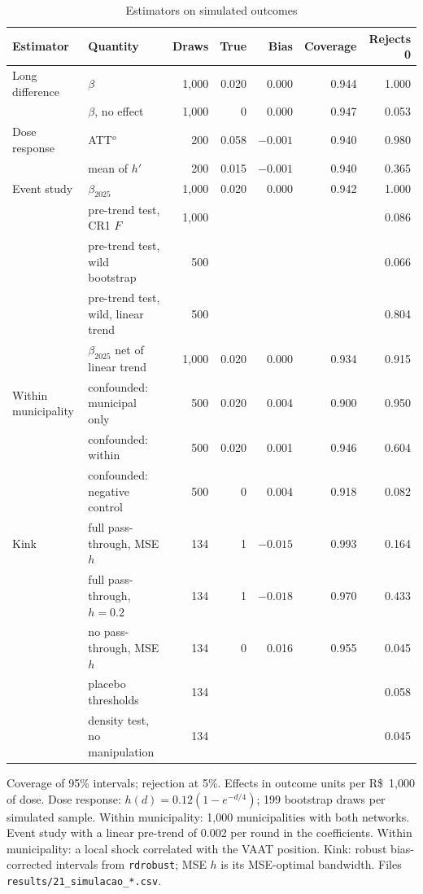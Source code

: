 \documentclass[11pt]{article}
\newcommand{\reais}{R\$}
\begin{document}
\begin{table}[h]
\centering
\caption{Estimators on simulated outcomes}\label{tab:sim}
\small
\setlength{\tabcolsep}{4pt}
\begin{tabular}{llrrrrr}
\toprule
Estimator & Quantity & Draws & True & Bias & Coverage & Rejects 0 \\
\midrule
Long difference & $\beta$ & 1,000 & 0.020 & 0.000 & 0.944 & 1.000 \\
 & $\beta$, no effect & 1,000 & 0 & 0.000 & 0.947 & 0.053 \\
Dose response & ATT$^o$ & 200 & 0.058 & $-0.001$ & 0.940 & 0.980 \\
 & mean of $h'$ & 200 & 0.015 & $-0.001$ & 0.940 & 0.365 \\
Event study & $\beta_{2025}$ & 1,000 & 0.020 & 0.000 & 0.942 & 1.000 \\
 & pre-trend test, CR1 $F$ & 1,000 & & & & 0.086 \\
 & pre-trend test, wild bootstrap & 500 & & & & 0.066 \\
 & pre-trend test, wild, linear trend & 500 & & & & 0.804 \\
 & $\beta_{2025}$ net of linear trend & 1,000 & 0.020 & 0.000 & 0.934 & 0.915 \\
Within municipality & confounded: municipal only & 500 & 0.020 & 0.004 & 0.900 & 0.950 \\
 & confounded: within & 500 & 0.020 & 0.001 & 0.946 & 0.604 \\
 & confounded: negative control & 500 & 0 & 0.004 & 0.918 & 0.082 \\
Kink & full pass-through, MSE $h$ & 134 & 1 & $-0.015$ & 0.993 & 0.164 \\
 & full pass-through, $h = 0.2$ & 134 & 1 & $-0.018$ & 0.970 & 0.433 \\
 & no pass-through, MSE $h$ & 134 & 0 & 0.016 & 0.955 & 0.045 \\
 & placebo thresholds & 134 & & & & 0.058 \\
 & density test, no manipulation & 134 & & & & 0.045 \\
\bottomrule
\end{tabular}

\smallskip
\footnotesize Coverage of 95\% intervals; rejection at 5\%. Effects in outcome units per \reais{}~1,000 of dose. Dose response: $h(d) = 0.12(1 - e^{-d/4})$; 199 bootstrap draws per simulated sample. Within municipality: 1,000 municipalities with both networks. Event study with a linear pre-trend of 0.002 per round in the coefficients. Within municipality: a local shock correlated with the VAAT position. Kink: robust bias-corrected intervals from \texttt{rdrobust}; MSE $h$ is its MSE-optimal bandwidth. Files \texttt{results/21\_simulacao\_*.csv}.
\end{table}
\end{document}
